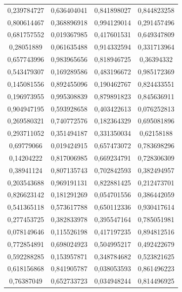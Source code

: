 \documentclass[a4paper,12pt]{article}
\begin{document}
\begin{longtable}{|c|c|c|c|}
	0,239784727 & 0,636404041 & 0,841898027 & 0,844823258 \\
	0,800614467 & 0,368896918 & 0,994129014 & 0,291457496 \\
	0,681757552 & 0,019367985 & 0,417601531 & 0,649347809 \\
	0,28051889 & 0,061635488 & 0,914332594 & 0,331713964 \\
	0,657743996 & 0,983965656 & 0,818946725 & 0,36394332 \\
	0,543479307 & 0,169289586 & 0,483196672 & 0,985172369 \\
	0,145081556 & 0,892455096 & 0,190462767 & 0,824433551 \\
	0,196973955 & 0,995308839 & 0,879891823 & 0,845636911 \\
	0,904947195 & 0,593928658 & 0,403422613 & 0,076252813 \\
	0,269580321 & 0,740772576 & 0,182364329 & 0,695081896 \\
	0,293711052 & 0,351494187 & 0,331350034 & 0,62158188 \\
	0,69779066 & 0,019424915 & 0,657473072 & 0,783698296 \\
	0,14204222 & 0,817006985 & 0,669234791 & 0,728306309 \\
	0,38941124 & 0,807135743 & 0,702842593 & 0,382494957 \\
	0,203543688 & 0,969191131 & 0,822881425 & 0,212473701 \\
	0,826623142 & 0,181291269 & 0,054701556 & 0,386442059 \\
	0,541365118 & 0,573617788 & 0,650112336 & 0,930417614 \\
	0,277453725 & 0,382833978 & 0,395547164 & 0,785051981 \\
	0,078149646 & 0,115526198 & 0,417197235 & 0,894812516 \\
	0,772854891 & 0,698024923 & 0,504995217 & 0,492422679 \\
	0,592288285 & 0,153957871 & 0,348784682 & 0,523821625 \\
	0,618156868 & 0,841905787 & 0,038053593 & 0,861496223 \\
	0,76387049 & 0,652733723 & 0,034948244 & 0,814496925 \\
\end{longtable}
\end{document}
